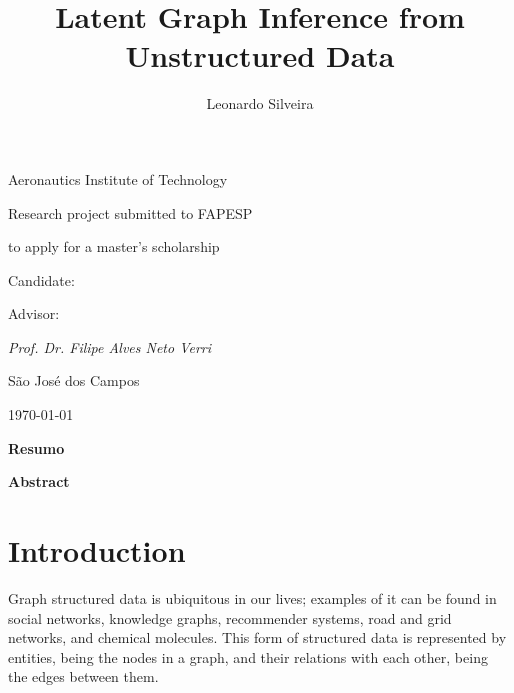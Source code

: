 \documentclass[12pt,a4paper]{article}
\title{Latent Graph Inference from Unstructured Data}
\author{Leonardo Silveira}
\begin{document}
\makeatletter
\begin{titlepage}
	{\centering Aeronautics Institute of Technology\par}
	\vspace{1.2cm}
	
	{\centering\Large\scshape \@title\par}
	\vspace{1cm}
	
	{\centering Research project submitted to FAPESP\par}
	{\centering to apply for a master's scholarship \par}
	\vspace{1cm}
	
	{\centering Candidate:\par}
	{\centering\large\itshape \@author\par}
	\vspace{1cm}
	
	{\centering Advisor:\par}
	{\centering\large\itshape Prof. Dr. Filipe Alves Neto Verri\par}
	
	\vfill
	{\centering São José dos Campos\par}
	{\centering \today \par}

\end{titlepage}

	\makeatother
	
	\tableofcontents
	\clearpage
	
	{\centering\large\bfseries Resumo\par}
	\vspace{0.5cm}
	
	
	\clearpage
	{\centering\large\bfseries Abstract\par}
	\vspace{0.5cm}
	
	
	\section{Introduction}
	\label{sec:introduction}
	
	Graph structured data is ubiquitous in our lives; examples of it can be found in social networks, knowledge graphs, recommender systems, road and grid networks, and chemical molecules. This form of structured data is represented by entities, being the nodes in a graph, and their relations with each other, being the edges between them. 
	
\end{document}
